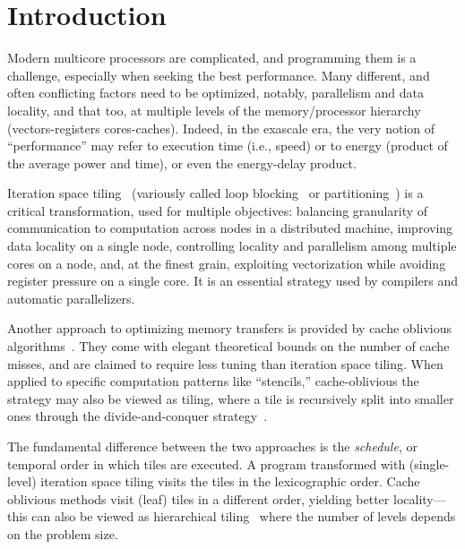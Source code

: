 \section{Introduction}
\label{sec:introduction}

Modern multicore processors are complicated, and programming them is a
challenge, especially when seeking the best performance.  Many different, and
often conflicting factors need to be optimized, notably, parallelism and data
locality, and that too, at multiple levels of the memory/processor hierarchy
(vectors-registers cores-caches).  Indeed, in the exascale era, the very
notion of ``performance'' may refer to execution time (i.e., speed) or to
energy (product of the average power and time), or even the energy-delay
product.

Iteration space tiling~\cite{irigoin-popl88, Wol87, Wolf91tiling} (variously
called loop blocking~\cite{schreiber-TR90} or
partitioning~\cite{bu-deprettere, darte-partitioning91, teich-thiele93}) is a
critical transformation, used for multiple objectives: balancing granularity
of communication to computation across nodes in a distributed machine,
improving data locality on a single node, controlling locality and parallelism
among multiple cores on a node, and, at the finest grain, exploiting
vectorization while avoiding register pressure on a single core.  It is an
essential strategy used by compilers and automatic parallelizers.


Another approach to optimizing memory transfers is provided by cache oblivious
algorithms~\cite{prokop-thesis99, frigo-etal-focs99}.  They come with elegant
theoretical bounds on the number of cache misses, and are claimed to require
less tuning than iteration space tiling.  When applied to specific computation
patterns like ``stencils,'' cache-oblivious the strategy may also be viewed as
tiling, where a tile is recursively split into smaller ones through the
divide-and-conquer strategy~\cite{frigo-strumpen-ics05}.

The fundamental difference between the two approaches is the \emph{schedule},
or temporal order in which tiles are executed. A program transformed with
(single-level) iteration space tiling visits the tiles in the lexicographic
order.  Cache oblivious methods visit (leaf) tiles in a different order,
yielding better locality---this can also be viewed as hierarchical
tiling~\cite{carter1995hierarchical} where the number of levels depends on the
problem size.

